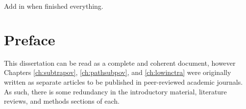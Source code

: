 \documentclass[11 pt, letterpaper]{report}
\begin{document}

Add in when finished everything.



%
%
%
%

%
%
%
%
%
%
%


\newpage





\tableofcontents


\newpage







\listoffigures

\newpage



\listoftables



\hypersetup{
	colorlinks=true,
	linkcolor=red,
	citecolor=blue,
	urlcolor=blue
}



\newpage


\chapter*{Preface}


This dissertation can be read as a complete and coherent document, however Chapters \ref{ch:subtrapov}, \ref{ch:pathsubpov}, and \ref{ch:lowinctra} were originally written as separate articles to be published in peer-reviewed academic journals. As such, there is some redundancy in the introductory material, literature reviews, and methods sections of each. 
\end{document}
